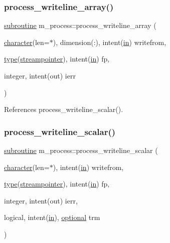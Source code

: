 \subsubsection{\texorpdfstring{process\+\_\+writeline\+\_\+array()}{process\_writeline\_array()}}
{\footnotesize\ttfamily \hyperlink{M__stopwatch_83_8txt_acfbcff50169d691ff02d4a123ed70482}{subroutine} m\+\_\+process\+::process\+\_\+writeline\+\_\+array (\begin{DoxyParamCaption}\item[{\hyperlink{option__stopwatch_83_8txt_abd4b21fbbd175834027b5224bfe97e66}{character}(len=$\ast$), dimension(\+:), intent(\hyperlink{M__journal_83_8txt_afce72651d1eed785a2132bee863b2f38}{in})}]{writefrom,  }\item[{\hyperlink{stop__watch_83_8txt_a70f0ead91c32e25323c03265aa302c1c}{type}(\hyperlink{structm__process_1_1streampointer}{streampointer}), intent(\hyperlink{M__journal_83_8txt_afce72651d1eed785a2132bee863b2f38}{in})}]{fp,  }\item[{integer, intent(out)}]{ierr }\end{DoxyParamCaption})\hspace{0.3cm}{\ttfamily [private]}}



References process\+\_\+writeline\+\_\+scalar().

\mbox{\label{namespacem__process_a72527c0ec0af26dcb14b8bfad6dcd482}} 
\subsubsection{\texorpdfstring{process\+\_\+writeline\+\_\+scalar()}{process\_writeline\_scalar()}}
{\footnotesize\ttfamily \hyperlink{M__stopwatch_83_8txt_acfbcff50169d691ff02d4a123ed70482}{subroutine} m\+\_\+process\+::process\+\_\+writeline\+\_\+scalar (\begin{DoxyParamCaption}\item[{\hyperlink{option__stopwatch_83_8txt_abd4b21fbbd175834027b5224bfe97e66}{character}(len=$\ast$), intent(\hyperlink{M__journal_83_8txt_afce72651d1eed785a2132bee863b2f38}{in})}]{writefrom,  }\item[{\hyperlink{stop__watch_83_8txt_a70f0ead91c32e25323c03265aa302c1c}{type}(\hyperlink{structm__process_1_1streampointer}{streampointer}), intent(\hyperlink{M__journal_83_8txt_afce72651d1eed785a2132bee863b2f38}{in})}]{fp,  }\item[{integer, intent(out)}]{ierr,  }\item[{logical, intent(\hyperlink{M__journal_83_8txt_afce72651d1eed785a2132bee863b2f38}{in}), \hyperlink{option__stopwatch_83_8txt_aa4ece75e7acf58a4843f70fe18c3ade5}{optional}}]{trm }\end{DoxyParamCaption})\hspace{0.3cm}{\ttfamily [private]}}




